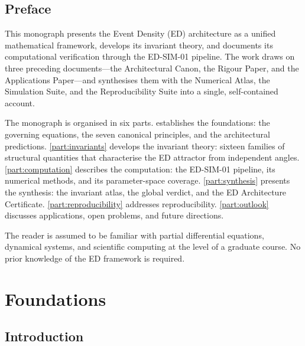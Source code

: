 \documentclass[11pt,twoside,openright]{book}
\theoremstyle{definition}
\theoremstyle{plain}
\theoremstyle{definition}
\theoremstyle{remark}
\begin{document}
\chapter*{Preface}

This monograph presents the Event Density (ED) architecture as a unified mathematical framework, develops its invariant theory, and documents its computational verification through the ED-SIM-01 pipeline. The work draws on three preceding documents---the Architectural Canon, the Rigour Paper, and the Applications Paper---and synthesises them with the Numerical Atlas, the Simulation Suite, and the Reproducibility Suite into a single, self-contained account.

The monograph is organised in six parts. \cref{part:foundations} establishes the foundations: the governing equations, the seven canonical principles, and the architectural predictions. \cref{part:invariants} develops the invariant theory: sixteen families of structural quantities that characterise the ED attractor from independent angles. \cref{part:computation} describes the computation: the ED-SIM-01 pipeline, its numerical methods, and its parameter-space coverage. \cref{part:synthesis} presents the synthesis: the invariant atlas, the global verdict, and the ED Architecture Certificate. \cref{part:reproducibility} addresses reproducibility. \cref{part:outlook} discusses applications, open problems, and future directions.

The reader is assumed to be familiar with partial differential equations, dynamical systems, and scientific computing at the level of a graduate course. No prior knowledge of the ED framework is required.


\mainmatter

\part{Foundations}\label{part:foundations}

\chapter{Introduction}\label{ch:intro}
\end{document}
